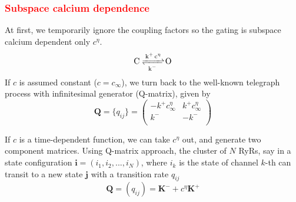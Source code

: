 \subsubsection{\textcolor{red}{\bf Subspace calcium dependence}}

At first, we temporarily ignore the coupling factors so the gating is subspace
calcium dependent only $c^\eta$.
\begin{equation}
  \ce{C <=>[\ce{k^+ c^\eta}][k^-] O}
\end{equation}
If $c$ is assumed constant ($c=c_\infty$), we turn back to the well-known
telegraph process with infinitesimal generator (Q-matrix), given by
\begin{equation}
 \mathbf{Q} = \{ q_{ij}\} = \left( \begin{array}{cc}
 -k^+c^\eta_\infty & k^+c^\eta_\infty \\
  k^- & -k^- \\
 \end{array}\right)
\end{equation}

If $c$ is a time-dependent function, we can take $c^\eta$ out, and generate two
component matrices. Using Q-matrix approach, the
cluster of $N$ RyRs, say in a state configuration
$\mathbf{i}=(i_1,i_2,...,i_N)$, where $i_k$ is the state of channel
$k$-th can transit to a new state $\mathbf{j}$ with a transition rate
$q_{ij}$
\begin{equation}
  \label{eq:1137}
  \mathbf{Q} = (q_{ij}) = \mathbf{K^-}+c^\eta\mathbf{K^+}
\end{equation}

